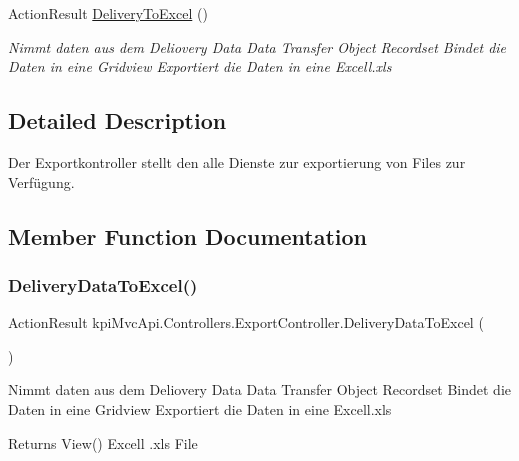 \begin{DoxyCompactItemize}
Action\+Result \hyperlink{classkpi_mvc_api_1_1_controllers_1_1_export_controller_a5de667891d862c9faa1175625cf563f4}{Delivery\+To\+Excel} ()
\begin{DoxyCompactList}\small\item\em Nimmt daten aus dem Deliovery Data Data Transfer Object Recordset Bindet die Daten in eine Gridview Exportiert die Daten in eine Excell.\+xls \end{DoxyCompactList}\end{DoxyCompactItemize}


\subsection{Detailed Description}
Der Exportkontroller stellt den alle Dienste zur exportierung von Files zur Verfügung. 



\subsection{Member Function Documentation}
\mbox{\label{classkpi_mvc_api_1_1_controllers_1_1_export_controller_a9bfabbfc7273a1c541a8e3bd33ea08e6}} 
\subsubsection{\texorpdfstring{Delivery\+Data\+To\+Excel()}{DeliveryDataToExcel()}}
{\footnotesize\ttfamily Action\+Result kpi\+Mvc\+Api.\+Controllers.\+Export\+Controller.\+Delivery\+Data\+To\+Excel (\begin{DoxyParamCaption}{ }\end{DoxyParamCaption})\hspace{0.3cm}{\ttfamily [inline]}}



Nimmt daten aus dem Deliovery Data Data Transfer Object Recordset Bindet die Daten in eine Gridview Exportiert die Daten in eine Excell.\+xls 

\begin{DoxyReturn}{Returns}
View() Excell .xls File 
\end{DoxyReturn}
\mbox{\label{classkpi_mvc_api_1_1_controllers_1_1_export_controller_a5de667891d862c9faa1175625cf563f4}} 
